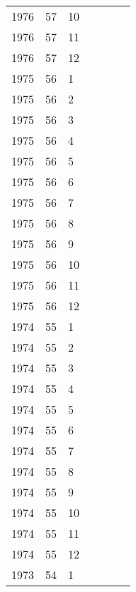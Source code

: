 \begin{longtable}{ |l|l|l|l|p{2.7cm}|l|p{2cm}| }
 1976 & 57 &    10 &         &                &  & \\
 1976 & 57 &    11 &         &                &  & \\
 1976 & 57 &    12 &         &                &   & \\
 1975 & 56 &     1 &         &                &  & \\
 1975 & 56 &     2 &         &                &  & \\
 1975 & 56 &     3 &         &                &  & \\
 1975 & 56 &     4 &         &                &  & \\
 1975 & 56 &     5 &         &                &  & \\
 1975 & 56 &     6 &         &                &  & \\
 1975 & 56 &     7 &         &                &  & \\
 1975 & 56 &     8 &         &                &  & \\
 1975 & 56 &     9 &         &                &  & \\
 1975 & 56 &    10 &         &                &  & \\
 1975 & 56 &    11 &         &                &  & \\
 1975 & 56 &    12 &         &                &  & \\
 1974 & 55 &     1 &         &                &  & \\
 1974 & 55 &     2 &         &                &  & \\
 1974 & 55 &     3 &         &                &  & \\
 1974 & 55 &     4 &         &                &  & \\
 1974 & 55 &     5 &         &                &  & \\
 1974 & 55 &     6 &         &                &  & \\
 1974 & 55 &     7 &         &                &  & \\
 1974 & 55 &     8 &         &                &  & \\
 1974 & 55 &     9 &         &                &  & \\
 1974 & 55 &    10 &         &                &  & \\
 1974 & 55 &    11 &         &                &  & \\
 1974 & 55 &    12 &         &                &  & \\
 1973 & 54 &     1 &         &                &  & \\

\end{longtable}
